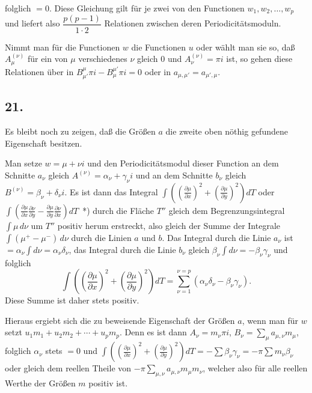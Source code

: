 \documentclass{article}
\begin{document}
folglich $= 0$. Diese Gleichung gilt für je zwei von den Functionen $w_{1}, w_{2}, \ldots, w_{p}$ und liefert also $\dfrac{p(p-1)}{1 \cdot 2}$ Relationen zwischen deren Periodicitätsmoduln.

Nimmt man für die Functionen $w$ die Functionen $u$ oder wählt man sie so, daß $A_{\mu}^{(\nu)}$ für ein von $\mu$ verschiedenes $\nu$ gleich 0 und $A_{\nu}^{(\nu)} = \pi i$ ist, so gehen diese Relationen über in $B_{\mu'}^{\mu} \pi i - B_{\mu}^{\mu'} \pi i = 0$ oder in $a_{\mu,\mu'} = a_{\mu',\mu}$.

\subsection*{21.}

Es bleibt noch zu zeigen, daß die Größen $a$ die zweite oben nöthig gefundene Eigenschaft besitzen.

Man setze $w = \mu + \nu i$ und den Periodicitätsmodul dieser Function an dem Schnitte $a_{\nu}$ gleich $A^{(\nu)} = \alpha_{\nu} + \gamma_{\nu} i$ und an dem Schnitte $b_{\nu}$ gleich $B^{(\nu)} = \beta_{\nu} + \delta_{\nu} i$. Es ist dann das Integral $\displaystyle\int \left(\left(\frac{\partial\mu}{\partial x}\right)^{2} + \left(\frac{\partial\mu}{\partial y}\right)^{2}\right) dT$ oder $\displaystyle\int \left(\frac{\partial\mu}{\partial x}\frac{\partial\nu}{\partial y} - \frac{\partial\mu}{\partial y}\frac{\partial\nu}{\partial x}\right) dT$~*) durch die Fläche $T''$ gleich dem Begrenzungsintegral $\displaystyle\int \mu\, d\nu$ um $T''$ positiv herum erstreckt, also gleich der Summe der Integrale $\displaystyle\int (\mu^{+} - \mu^{-})\, d\nu$ durch die Linien $a$ und $b$. Das Integral durch die Linie $a_{\nu}$ ist $= \alpha_{\nu} \displaystyle\int d\nu = \alpha_{\nu}\delta_{\nu}$, das Integral durch die Linie $b_{\nu}$ gleich $\beta_{\nu} \displaystyle\int d\nu = -\beta_{\nu}\gamma_{\nu}$ und folglich
\[ \int \left(\left(\frac{\partial\mu}{\partial x}\right)^{2} + \left(\frac{\partial\mu}{\partial y}\right)^{2}\right) dT = \sum_{\nu=1}^{\nu=p} (\alpha_{\nu}\delta_{\nu} - \beta_{\nu}\gamma_{\nu}). \]
Diese Summe ist daher stets positiv.

Hieraus ergiebt sich die zu beweisende Eigenschaft der Größen $a$, wenn man für $w$ setzt $u_{1}m_{1} + u_{2}m_{2} + \cdots + u_{p}m_{p}$. Denn es ist dann $A_{\nu} = m_{\nu}\pi i$, $B_{\nu} = \displaystyle\sum_{\mu} a_{\mu,\nu} m_{\mu}$, folglich $\alpha_{\nu}$ stets $= 0$ und $\displaystyle\int \left(\left(\frac{\partial\mu}{\partial x}\right)^{2} + \left(\frac{\partial\mu}{\partial y}\right)^{2}\right) dT = -\sum \beta_{\nu}\gamma_{\nu} = -\pi \sum m_{\nu}\beta_{\nu}$ oder gleich dem reellen Theile von $-\pi \displaystyle\sum_{\mu,\nu} a_{\mu,\nu} m_{\mu} m_{\nu}$, welcher also für alle reellen Werthe der Größen $m$ positiv ist.
\end{document}
